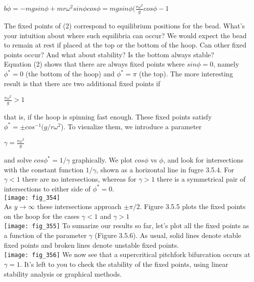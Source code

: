 \documentclass{article}
\newcommand\tab[1][1cm]{\hspace*{#1}}
\begin{document}
\begin{center}
$b\dot{\phi}=-mg sin \phi + mr \omega^{2}sin\phi cos\phi = mg sin \phi (\frac{r\omega^{2}}{g}cos \phi -1$ 
\end{center}
The fixed points of (2) correspond to equilibrium positions for the bead. What's your intuition about where such equilibria can occur? We would expect the bead to remain at rest if placed at the top or the bottom of the hoop. Can other fixed points occur? And what about stability? Is the bottom always stable? \\
\tab Equation (2) shows that there are always fixed points where $sin\phi = 0$, namely $\phi^{*}=0$ (the bottom of the hoop) and $\phi^{*}=\pi$ (the top). The more interesting result is that there are two additional fixed points if
\begin{center}
$\frac{r \omega^{2}}{g} > 1$
\end{center}
that is, if the hoop is spinning fast enough. These fixed points satisfy $\phi^{*}= \pm cos^{-1}(g/r\omega^{2}$). To visualize them, we introduce a parameter
\begin{center}
$\gamma = \frac{r \omega^{2}}{g}$
\end{center}
and solve $cos \phi^{*}=1/\gamma$ graphically. We plot $cos\phi$ vs $\phi$, and look for intersections with the constant function $1/\gamma$, shown as a horizontal line in fugre 3.5.4. For $\gamma < 1$ there are no intersections, whereas for $\gamma > 1$ there is a symmetrical pair of intersections to either side of $\phi^{*}=0$. \\
\texttt{[image: fig\_354]} \\
As $y \to \infty$ these intersections approach $\pm \pi /2$. Figure 3.5.5 plots the fixed points on the hoop for the cases $\gamma < 1$ and $\gamma > 1$  \\
\texttt{[image: fig\_355]}
To sumarize our results so far, let's plot all the fixed points as a function of the parameter $\gamma$ (Figure 3.5.6). As usual, solid lines denote stable fixed points and broken lines denote unstable fixed points. \\
\texttt{[image: fig\_356]}
We now see that a supercritical pitchfork bifurcation occurs at $\gamma = 1$. It's left to you to check the stability of the fixed points, using linear stability analysis or graphical methods. \\
\end{document}
